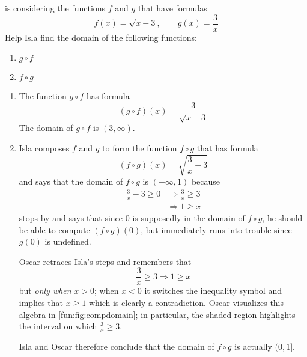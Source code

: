 \begin{pccexample}
 is considering the functions $f$ and $g$ that have formulas
\[
	f(x)=\sqrt{x-3}, \qquad g(x)= \frac{3}{x}
\]
Help Isla find the domain of the following functions:
\begin{enumerate}
	\item $g\circ f$
	\item $f\circ g$
\end{enumerate}
\begin{pccsolution}
\begin{enumerate}
	\item The function $g\circ f$ has formula
	\[
		(g\circ f)(x) = \frac{3}{\sqrt{x-3}}
	\]
	The domain of $g\circ f$ is $(3,\infty)$.
	\item Isla composes $f$ and $g$ to form the function $f\circ g$ that has formula
	\[
		(f\circ g)(x) = \sqrt{\frac{3}{x}-3}
	\]
	and says that the domain of $f\circ g$ is $(-\infty,1)$ because
	\begin{align*}
		\frac{3}{x}-3 \geq 0 & \Rightarrow \frac{3}{x}\geq 3 \\
		                     & \Rightarrow 1\geq x           
	\end{align*}
	 stops by and says that since $0$ is supposedly in the domain 
	of $f\circ g$, he should be able to compute $(f\circ g)(0)$, but immediately 
	runs into trouble since $g(0)$ is undefined.
	
	\begin{marginfigure}
		\centering
		\label{fun:fig:compdomain}
	\end{marginfigure}
	Oscar retraces Isla's steps and remembers that 
	\[
		\frac{3}{x}\geq 3\Rightarrow 1\geq x
	\]
	but \emph{only when} $x>0$; when $x<0$ it switches the inequality symbol
	and implies that $x\geq 1$ which is clearly a contradiction. Oscar visualizes 
	this algebra in \cref{fun:fig:compdomain}; in particular, the shaded region 
	highlights the interval on which $\frac{3}{x}\geq 3$.
	
	Isla and Oscar therefore conclude that the domain of $f\circ g$ is actually 
	$(0,1]$.
\end{enumerate}
\end{pccsolution}
\end{pccexample}


